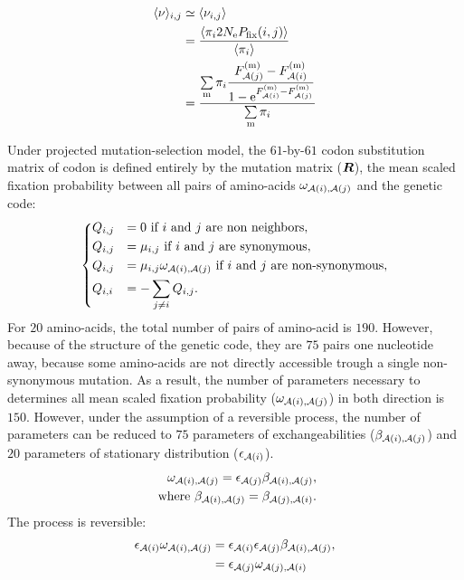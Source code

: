 \begin{align}
    \langle \nu \rangle_{{i}, {j}} & \simeq \langle \nu_{{i}, {j}} \rangle \\
    & = \dfrac{ \langle \pi_{{i}} 2N_{\textrm{e}} P_{\mathrm{fix}}({i}, {j}) \rangle }{ \langle \pi_{{i}} \rangle } \\
    & = \dfrac{ \sum\limits_{\text{m}}  \pi_{{i}}\dfrac{F_{\mathcal{A}({j})}^{(\text{m})} - F_{\mathcal{A}({i})}^{(\text{m})}}{1 - \mathrm{e}^{F_{\mathcal{A}({i})}^{(\text{m})} - F_{\mathcal{A}({j})}^{(\text{m})}}} }{ \sum\limits_{\text{m}} \pi_{{i}} }
\end{align}

Under projected mutation-selection model, the $61$-by-$61$ \gls{codon} \gls{substitution} matrix of \gls{codon} is defined entirely by the mutation matrix ($\bm{R}$), the mean scaled fixation probability between all pairs of amino-acids $\omega_{\mathcal{A}({i}), \mathcal{A}({j})}$ and the genetic code:
\begin{equation}
    \begin{dcases}
        Q_{{i}, {j}} & = 0 \text{ if ${i}$ and ${j}$ are non neighbors}, \\
        Q_{{i}, {j}} & = \mu_{{i}, {j}} \text{ if ${i}$ and ${j}$ are synonymous}, \\
        Q_{{i}, {j}} & = \mu_{{i}, {j}} \omega_{\mathcal{A}({i}), \mathcal{A}({j})} \text{ if ${i}$ and ${j}$ are non-synonymous}, \\
        Q_{{i}, {i}} & = - \sum\limits_{{j} \neq {i}} Q_{{i}, {j}}.
    \end{dcases}
    \label{eq:codon-mean-field}
\end{equation}
For $20$ amino-acids, the total number of pairs of amino-acid is $190$.
However, because of the structure of the genetic code, they are $75$ pairs one nucleotide away, because some amino-acids are not directly accessible trough a single non-synonymous mutation.
As a result, the number of parameters necessary to determines all mean scaled fixation probability ($\omega_{\mathcal{A}({i}), \mathcal{A}({j})}$) in both direction is $150$.
However, under the assumption of a reversible process, the number of parameters can be reduced to $75$ parameters of exchangeabilities ($\beta_{\mathcal{A}({i}), \mathcal{A}({j})}$) and $20$ parameters of stationary distribution ($\epsilon_{\mathcal{A}({i})}$).
\begin{align}
    \omega_{\mathcal{A}({i}), \mathcal{A}({j})} = \epsilon_{\mathcal{A}({j})} \beta_{\mathcal{A}({i}), \mathcal{A}({j})}, \\
    \text{ where } \beta_{\mathcal{A}({i}), \mathcal{A}({j})} = \beta_{\mathcal{A}({j}), \mathcal{A}({i})}.
\end{align}
The process is reversible:
\begin{align}
    \epsilon_{\mathcal{A}({i})} \omega_{\mathcal{A}({i}), \mathcal{A}({j})} & = \epsilon_{\mathcal{A}({i})} \epsilon_{\mathcal{A}({j})} \beta_{\mathcal{A}({i}), \mathcal{A}({j})}, \\
    & = \epsilon_{\mathcal{A}({j})} \omega_{\mathcal{A}({j}), \mathcal{A}({i})}
\end{align}

